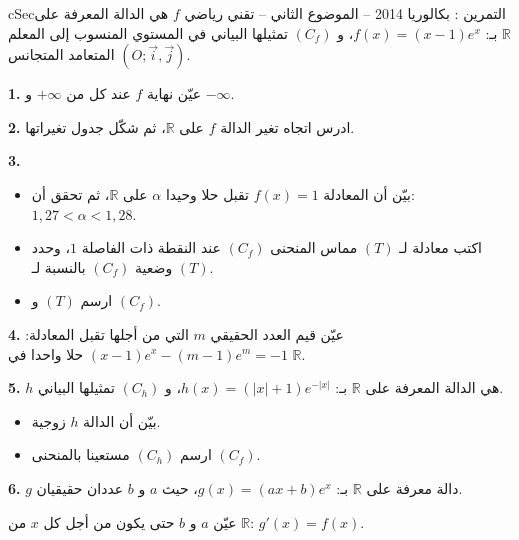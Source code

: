 \documentclass[12pt,a4paper]{article}
\newenvironment{BOX}[2]{\begin{otherlanguage}{english}\begin{arbox}{#1}{#2}}{\end{arbox}\end{otherlanguage}}
\newcounter{exo}
\newenvironment{tamrin}[1]{\stepcounter{exo}\begin{BOX}{cSec}{التمرين \theexo: #1}}{\end{BOX}}
\newcommand{\R}{\mathbb{R}}
\newenvironment{sq}{\begin{itemize}[leftmargin=2.4em,itemsep=3pt]}{\end{itemize}}
\newcommand{\qa}{\item[(أ)]}\newcommand{\qb}{\item[(ب)]}\newcommand{\qc}{\item[(جـ)]}\newcommand{\qd}{\item[(د)]}\newcommand{\qe}{\item[(هـ)]}
\newcommand{\QQ}[1]{\par\smallskip\textbf{#1.} }
\begin{document}
\begin{tamrin}{بكالوريا 2014 -- الموضوع الثاني -- تقني رياضي}
$f$ هي الدالة المعرفة على $\R$ بـ: $f(x)=(x-1)e^{x}$،
و $(C_f)$ تمثيلها البياني في المستوي المنسوب إلى المعلم المتعامد المتجانس $(O;\vec i,\vec j)$.
\QQ{1} عيّن نهاية $f$ عند كل من $+\infty$ و $-\infty$.
\QQ{2} ادرس اتجاه تغير الدالة $f$ على $\R$، ثم شكّل جدول تغيراتها.
\QQ{3}
\begin{sq}
\qa بيّن أن المعادلة $f(x)=1$ تقبل حلا وحيدا $\alpha$ على $\R$، ثم تحقق أن: $1{,}27<\alpha<1{,}28$.
\qb اكتب معادلة لـ $(T)$ مماس المنحنى $(C_f)$ عند النقطة ذات الفاصلة $1$، وحدد وضعية $(C_f)$ بالنسبة لـ $(T)$.
\qc ارسم $(T)$ و $(C_f)$.
\end{sq}
\QQ{4} عيّن قيم العدد الحقيقي $m$ التي من أجلها تقبل المعادلة: $(x-1)e^{x}-(m-1)e^{m}=-1$ حلا واحدا في $\R$.
\QQ{5} $h$ هي الدالة المعرفة على $\R$ بـ: $h(x)=\left(|x|+1\right)e^{-|x|}$، و $(C_h)$ تمثيلها البياني.
\begin{sq}
\qa بيّن أن الدالة $h$ زوجية.
\qb ارسم $(C_h)$ مستعينا بالمنحنى $(C_f)$.
\end{sq}
\QQ{6} $g$ دالة معرفة على $\R$ بـ: $g(x)=(ax+b)e^{x}$، حيث $a$ و $b$ عددان حقيقيان.
\par عيّن $a$ و $b$ حتى يكون من أجل كل $x$ من $\R$: $g'(x)=f(x)$.
\end{tamrin}
\end{document}
